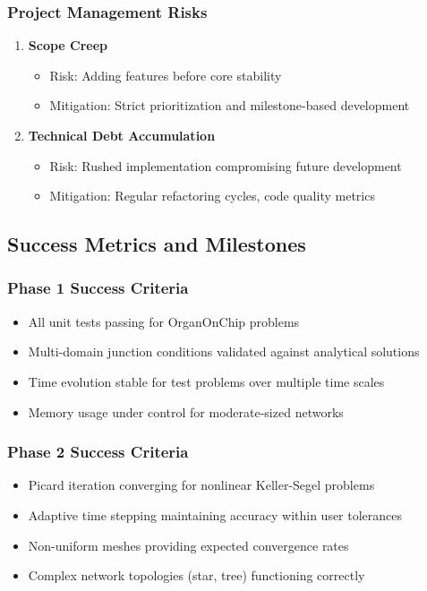 \subsubsection{Project Management Risks}
\begin{enumerate}
    \item \textbf{Scope Creep}
    \begin{itemize}
        \item Risk: Adding features before core stability
        \item Mitigation: Strict prioritization and milestone-based development
    \end{itemize}
    
    \item \textbf{Technical Debt Accumulation}
    \begin{itemize}
        \item Risk: Rushed implementation compromising future development
        \item Mitigation: Regular refactoring cycles, code quality metrics
    \end{itemize}
\end{enumerate}

\subsection{Success Metrics and Milestones}

\subsubsection{Phase 1 Success Criteria}
\begin{itemize}
    \item All unit tests passing for OrganOnChip problems
    \item Multi-domain junction conditions validated against analytical solutions
    \item Time evolution stable for test problems over multiple time scales
    \item Memory usage under control for moderate-sized networks
\end{itemize}

\subsubsection{Phase 2 Success Criteria}
\begin{itemize}
    \item Picard iteration converging for nonlinear Keller-Segel problems
    \item Adaptive time stepping maintaining accuracy within user tolerances
    \item Non-uniform meshes providing expected convergence rates
    \item Complex network topologies (star, tree) functioning correctly
\end{itemize}

